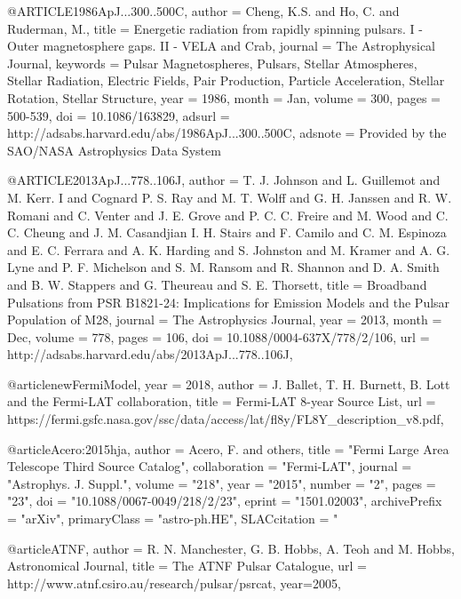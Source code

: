 {{@ARTICLE{1986ApJ...300..500C,
   author = {Cheng, K.S. and Ho, C. and Ruderman, M.},
    title = {Energetic radiation from rapidly spinning pulsars. I - Outer magnetosphere gaps. II - VELA and Crab},
  journal = {The Astrophysical Journal},
 keywords = {Pulsar Magnetospheres, Pulsars, Stellar Atmospheres, Stellar Radiation, Electric Fields, Pair Production, Particle Acceleration, Stellar Rotation, Stellar Structure},
     year = {1986},
    month = {Jan},
   volume = {300},
    pages = {500-539},
      doi = {10.1086/163829},
   adsurl = {http://adsabs.harvard.edu/abs/1986ApJ...300..500C},
  adsnote = {Provided by the SAO/NASA Astrophysics Data System}
}



@ARTICLE{2013ApJ...778..106J,
   author = {T. J. Johnson and L. Guillemot and M. Kerr. I and Cognard P. S. Ray and M. T. 
    Wolff and G. H. Janssen and 
    R. W. Romani and C. Venter and J. E. Grove and P. C. C. Freire and M. Wood and 
    C. C. Cheung and J. M. Casandjian I. H. Stairs and F. Camilo and C. M. Espinoza and 
    E. C. Ferrara and A. K. Harding and S. Johnston and M. Kramer and A. G. Lyne and 
    P. F. Michelson and S. M. Ransom and R. Shannon and D. A. Smith and B. W. Stappers and 
    G. Theureau and S. E. Thorsett},
    title = {Broadband Pulsations from PSR B1821-24: Implications for Emission Models and the Pulsar Population of M28},
  journal = {The Astrophysics Journal},
     year = {2013},
    month = {Dec},
   volume = {778},
    pages = {106},
      doi = {10.1088/0004-637X/778/2/106},
      url = {http://adsabs.harvard.edu/abs/2013ApJ...778..106J},
}


@article{newFermiModel,
  year = {2018},
  author = {J. Ballet, T. H. Burnett, B. Lott and the Fermi-LAT collaboration},
  title = {Fermi-LAT 8-year Source List},
  url = {https://fermi.gsfc.nasa.gov/ssc/data/access/lat/fl8y/FL8Y_description_v8.pdf},
}

@article{Acero:2015hja,
      author         = {Acero, F. and others},
      title          = "{Fermi Large Area Telescope Third Source Catalog}",
      collaboration  = "Fermi-LAT",
      journal        = "Astrophys. J. Suppl.",
      volume         = "218",
      year           = "2015",
      number         = "2",
      pages          = "23",
      doi            = "10.1088/0067-0049/218/2/23",
      eprint         = "1501.02003",
      archivePrefix  = "arXiv",
      primaryClass   = "astro-ph.HE",
      SLACcitation   = "%
}

@article{ATNF,
  author = {R. N. Manchester, G. B. Hobbs, A. Teoh and M. Hobbs, Astronomical Journal},
  title = {The ATNF Pulsar Catalogue},
  url = {http://www.atnf.csiro.au/research/pulsar/psrcat},
  year={2005},
}

}}
